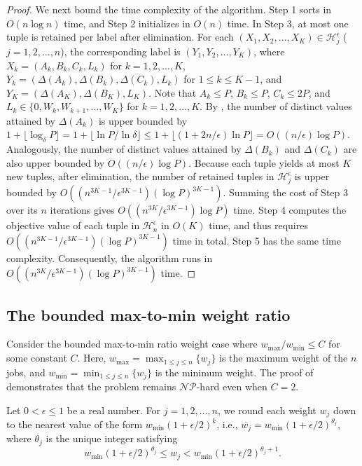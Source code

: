 \documentclass[12pt]{article}
\begin{document}
\begin{sloppypar}
\begin{proof}
            We next bound the time complexity of the algorithm. Step 1 sorts in $O(n\log n)$ time, and Step 2 initializes in $O(n)$ time. In Step 3, at most one tuple is retained per label after elimination.     
            For each $(X_1, X_2, \ldots, X_K) \in \mathcal{H}_j^{\epsilon}$ ($j=1, 2, \ldots, n$), the corresponding label is  $(Y_1, Y_2, \ldots, Y_K)$, where $X_k=(A_k, B_k, C_k, L_k)$ for $k=1, 2, \ldots, K$, $Y_k=(\Delta(A_k), \Delta(B_k), \Delta(C_k), L_k)$ for $1 \leq k \leq K-1$, and $Y_K=(\Delta(A_K), \Delta(B_K), L_K)$. Note that $A_k \leq P$, $B_k \leq P$, $C_k \leq 2P$, and $L_k \in \{0, W_k, W_{k+1}, \ldots, W_K\}$ for $k=1, 2, \ldots, K$. 
            By , the number of distinct values attained by $\Delta(A_k)$ is upper bounded by $1+\lfloor \log_{\delta} P \rfloor = 1+ \lfloor \ln P / \ln \delta \rfloor \leq 1+ \lfloor (1+2n/ \epsilon) \ln P \rfloor =O((n/ \epsilon) \log P)$. Analogously, the number of distinct values attained by $\Delta(B_k)$ and $\Delta(C_k)$ are also upper bounded by $O((n/\epsilon) \log P)$. Because each tuple yields at most $K$ new tuples, after elimination, the number of retained tuples in $\mathcal{H}_j^{\epsilon}$ is upper bounded by $O((n^{3K-1}/\epsilon^{3K-1}) (\log P)^{3K-1})$. Summing the cost of Step 3 over its $n$ iterations gives $O((n^{3K}/\epsilon^{3K-1}) \log P)$ time. Step 4 computes the objective value of each tuple in $\mathcal{H}_n^{\epsilon}$ in $O(K)$ time, and thus requires $O((n^{3K-1}/\epsilon^{3K-1}) (\log P)^{3K-1})$ time in total. Step 5 has the same time complexity. Consequently, the algorithm runs in $O((n^{3K}/\epsilon^{3K-1}) (\log P)^{3K-1})$ time. 
        \end{proof}
        
        \subsection{The bounded max-to-min weight ratio}  \label{Sec:bounded-weight}
        
        Consider the bounded max-to-min ratio weight case where $w_{\max}/w_{\min} \leq C$ for some constant $C$. Here, $w_{\max}=\max_{1 \leq j \leq n} \{w_j\}$ is the maximum weight of the $n$ jobs, and $w_{\min}=\min_{1 \leq j \leq n} \{w_j\}$ is the minimum weight.  The proof of  demonstrates that the problem remains $\mathcal{NP}$-hard even when $C=2$. 
        
        Let $0 < \epsilon \leq 1$ be a real number. For $j=1, 2, \ldots, n$, we round each weight $w_j$ down to the nearest value of the form  $w_{\min}(1+\epsilon/2)^k$, i.e., $\overline{w_j}=w_{\min}(1+\epsilon/2)^{\theta_j}$, where $\theta_j$ is the unique integer satisfying 
        \begin{equation} \label{eq-4.4-PTAS-1}
            w_{\min}(1+\epsilon/2)^{\theta_j} \leq w_j < w_{\min}(1+\epsilon/2)^{\theta_j+1}.
        \end{equation} 
        

\end{sloppypar}
\end{document}
